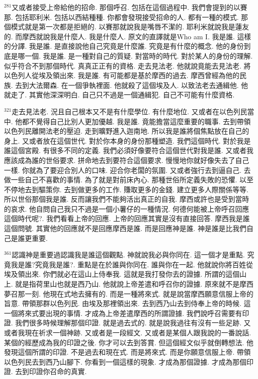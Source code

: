 \documentclass{book}
\begin{document}
$^{281}$又或者接受上帝給他的招命.
那個呼召.
包括在這個過程中.
我們會提到的以賽那.
包括耶利米.
包括以西結種種.
你都會發現接受招命的人.
都有一種的模式.
那個模式就是第一次都是拒絕的.
以賽那就說我是嘴唇不潔的.
耶利米就說我是蓮友的.
而摩西就說我是什麼人.
我是什麼人.
原文的直譯就是Who am I.
我是誰.
這樣的分譯.
我是誰.
是直接說他自己究竟是什麼誰.
究竟是有什麼的概念.
他的身份到底是哪一個.
我是誰.
是一種對自己的質疑.
對當時的時代.
對於某人的身份的理解.
似乎符合不到那個時代.
真真正正有的資格.
走去見法老.
他就說竟能去見法老.
將以色列人從埃及領出來.
我是誰.
有可能都是基於摩西的過去.
摩西曾經為他的民族.
去到大法爾森.
在一個爭執裡面.
他就殺了這個埃及人.
以致法老去通緝他.
他就走了.
其實他深深明白.
自己只不過是一個通緝犯.
自己不可能有什麼資格.

$^{321}$走去見法老.
況且自己根本又不是有什麼學位.
有什麼地位.
又或者在以色列民當中.
他都不覺得自己比別人更加優越.
我是誰.
竟能擔當這麼重要的職事.
去到帶領以色列民離開法老的壓迫.
走到曠野進入迦南地.
所以我是誰將個焦點放在自己的身上.
又或者放在這個世代.
對於你本身的身份那種塑造.
我們這個時代.
對於我是誰這個宮殿.
有很多不同的定義.
我們必須好像要符合這個世代對我是誰.
又或者我應該成為誰的世俗要求.
拼命地去到要符合這個要求.
慢慢地你就好像失去了自己一樣.
你就為了要迎合別人的口味.
迎合你老闆的氛圍.
又或者強行去到逼自己.
去做一些自己不喜歡的事情.
為了就是對前床內心.
那種世俗所定義失敗的恐懼.
以至不停地去到驅策你.
去到做更多的工作.
賺取更多的金錢.
建立更多人際關係等等.
所以世俗那個我是誰.
反而讓我們不能夠活出真正的自我.
摩西或許也是受到當時的哀求.
他自問自己我只不過是一個小薯仔的一種情況.
何德何能被上帝呼召回應這個時代呢?.
我們看看上帝的回應.
上帝的回應其實是沒有直接回答.
摩西我是誰這個問號.
其實他的回應就不是回應摩西是誰.
而是回應神是誰.
神是誰是比我們自己是誰更重要.

$^{361}$認識神是重要過認識我是誰這個觀點.
神就說我必與你同在.
這一個才是重點.
究竟我是誰?究竟我是誰?.
重點是在於誰與你同在.
誰與你在一起.
他就說你將百姓從埃及領出來.
你們就必在這山上侍奉我.
這就是我打發你去的證據.
所謂的這個山上.
就是指荷里山也就是西乃山.
他就說上帝差遣和呼召你的證據.
原來就不是摩西夢召那一刻.
他現在式地去擁有的.
而是一種將來式.
就是說當摩西願意信服上帝的旨意.
帶領那群以色列民.
由埃及那裡領出來.
去到西乃山去到侍奉上帝的時候.
這一個將來式要出現的事情.
才成為上帝差遣摩西的所謂證據.
我們說呼召需要有印證.
我們很多時候理解那個印證.
就是過去式的.
就是說我過往有沒有一些足跡.
又或者我現在祈求一個神跡.
又或者是一段經文.
又或者是某個人跟我說的一番說話.
某個的經歷成為我的印證之後.
你才可以去到答賞.
但這個經文似乎就倒轉想法.
他發現這個所謂的印證.
不是過去和現在式.
而是將來式.
而是你願意信服上帝.
帶領以色列民去到西乃山腳下.
你看到一個這樣的現象.
才成為那個證據.
才成為那個印證.
去到印證你召命的真實.
\end{document}
